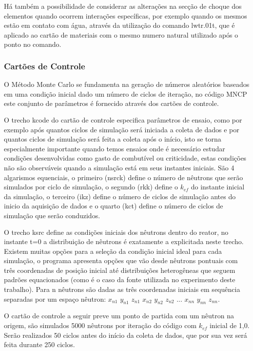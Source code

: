 \documentclass[
	12pt,				%
	openany,			%
	twoside,			%
	a4paper,			%
	english,			%
	french,				%
	spanish,			%
	brazil				%
	]{abntex2}
\begin{document}
Há também a possibilidade de considerar as alterações na secção de
choque dos elementos quando ocorrem interações específicas, por exemplo
quando os mesmos estão em contato com água, através da utilização
do comando lwtr.01t, que é aplicado ao cartão de materiais com o mesmo
numero natural utilizado após o ponto no comando.

\subsubsection*{Cartões de Controle}

O Método Monte Carlo se fundamenta na geração de números aleatórios
baseados em uma condição inicial dado um número de ciclos de iteração,
no código MNCP este conjunto de parâmetros é fornecido através dos
cartões de controle.

O trecho kcode do cartão de controle especifica parâmetros de ensaio,
como por exemplo após quantos ciclos de simulação será iniciada a
coleta de dados e por quantos ciclos de simulação será feita a coleta
após o início, isto se torna especialmente importante quando temos
ensaios onde é necessário estudar condições desenvolvidas como gasto
de combutível ou criticidade, estas condições não são observáveis
quando a simulação está em seus instantes iniciais. São 4 algarismos
equenciais, o primeiro (nsrck) define o número de nêutrons que serão
simulados por ciclo de simulação, o segundo (rkk) define o $k_{ef}$
do instante inicial da simulação, o terceiro (ikz) define o número
de ciclos de simulação antes do inicio da aquisição de dados e o quarto
(kct) define o número de ciclos de simulação que serão conduzidos.

O trecho ksrc define as condições iniciais dos nêutrons dentro do reator, no instante t=0 a distribuição de nêutrons é exatamente a explicitada neste trecho. Existem muitas opções para a seleção da condição inicial ideal para cada simulação, o programa apresenta opções que vão desde nêutrons pontuais com três coordenadas de posição inicial até distribuições heterogêneas que seguem padrões equacionados (como é o caso da fonte utilizada no experimento deste trabalho). Para n
nêutrons são dadas as três coordenadas iniciais em sequência separadas por um espaço nêutron: $x_{n1}$ $y_{n1}$ $z_{n1}$ $x_{n2}$ $y_{n2}$ $z_{n2}$ ... $x_{nn}$ $y_{nn}$ $z_{nn}$.

O cartão de controle a seguir preve um ponto de partida com um nêutron
na origem, são simulados 5000 nêutrons por iteração do código com
$k_{ef}$ inicial de 1,0. Serão realizados 50 ciclos antes do início
da coleta de dados, que por sua vez será feita durante 250 ciclos.
\end{document}
